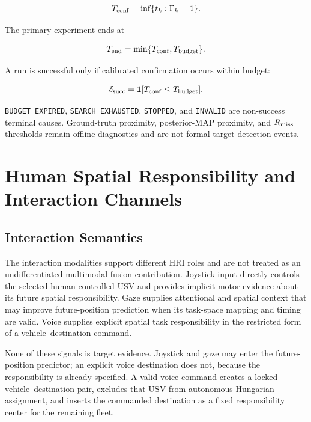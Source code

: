 \documentclass[conference]{IEEEtran}
\begin{document}
\begin{equation}
T_{\rm conf}=\inf\{t_k:\Gamma_k=1\}.
\label{eq:tconf}
\end{equation}

The primary experiment ends at

\begin{equation}
T_{\rm end}=\min\{T_{\rm conf},T_{\rm budget}\}.
\label{eq:tend}
\end{equation}

A run is successful only if calibrated confirmation occurs within budget:

\begin{equation}
\delta_{\rm succ}=
\mathbf{1}[T_{\rm conf}\leq T_{\rm budget}].
\label{eq:success_indicator}
\end{equation}

\texttt{BUDGET\_EXPIRED}, \texttt{SEARCH\_EXHAUSTED}, \texttt{STOPPED}, and
\texttt{INVALID} are non-success terminal causes. Ground-truth proximity,
posterior-MAP proximity, and $R_{\rm miss}$ thresholds remain offline diagnostics
and are not formal target-detection events.

\section{Human Spatial Responsibility and Interaction Channels}

\subsection{Interaction Semantics}

The interaction modalities support different HRI roles and are not treated as
an undifferentiated multimodal-fusion contribution. Joystick input directly
controls the selected human-controlled USV and provides implicit motor evidence
about its future spatial responsibility. Gaze supplies attentional and spatial
context that may improve future-position prediction when its task-space
mapping and timing are valid. Voice supplies explicit spatial task
responsibility in the restricted form of a vehicle--destination command.

None of these signals is target evidence. Joystick and gaze may enter the
future-position predictor; an explicit voice destination does not, because the
responsibility is already specified. A valid voice command creates a locked
vehicle--destination pair, excludes that USV from autonomous Hungarian
assignment, and inserts the commanded destination as a fixed responsibility
center for the remaining fleet.
\end{document}
